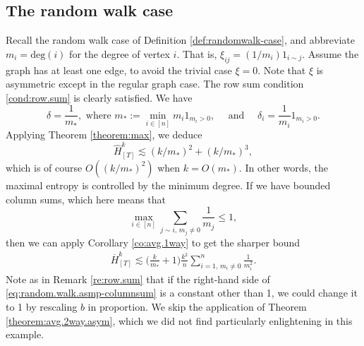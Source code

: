 \documentclass[11pt,reqno]{amsart}
\numberwithin{equation}{section}
\theoremstyle{definition}
\begin{document}
\subsection{The random walk case} \label{ex:random.walk.graph}
Recall the random walk case of Definition \ref{def:randomwalk-case}, and abbreviate $m_i=\mathrm{deg}(i)$ for the degree of vertex $i$.
That is,  $\xi_{ij}=(1/m_i)1_{i \sim j}$.
Assume the graph has at least one edge, to avoid the trivial case $\xi=0$.
Note that $\xi$ is asymmetric except in the regular graph case.
The row sum condition \eqref{cond:row.sum} is clearly satisfied. We have
	\begin{equation*}
		\delta = \frac{1}{m_*}, \text{ where } m_* := \min_{i \in [n]} m_i 1_{m_i>0}, \quad \text{ and } \quad
		 \delta_i  = \frac{1}{m_i }1_{m_i>0}.
	\end{equation*}
Applying Theorem \ref{theorem:max}, we deduce
	\begin{equation*}
		\widehat{H}^{k}_{[T]} \lesssim (k/m_*)^2 + (k/m_*)^3 ,
	\end{equation*}
	which is of course $O((k/m_*)^2)$ when $k =O(m_*)$.
In other words, the maximal entropy is controlled by the minimum degree.  
If we have bounded column sums, which here means that
	\begin{equation}
		\max_{i \in [n]} \sum_{j \sim i, \, m_j \neq 0} \frac{1 }{m_j} \le 1, \label{eq:random.walk.asmp-columnsum}
	\end{equation}
	then we can apply Corollary \ref{co:avg.1way} to get the sharper bound
	\begin{align}
		\overline{H}^{k}_{[T]} \lesssim \Big(\frac{k }{m_*} + 1\Big) \frac{k^2}{n} \sum_{i=1, \, m_i \neq 0}^n \frac{1 }{ m_i^2 } . \label{eq:random.walk.avg.1way}
	\end{align}
	Note as in Remark \ref{re:row.sum} that if the right-hand side of \eqref{eq:random.walk.asmp-columnsum} is a constant other than 1, we could change it to 1 by rescaling $b$ in proportion. We skip the application of Theorem \ref{theorem:avg.2way.asym}, which we did not find particularly enlightening in this example.  
	
\end{document}
